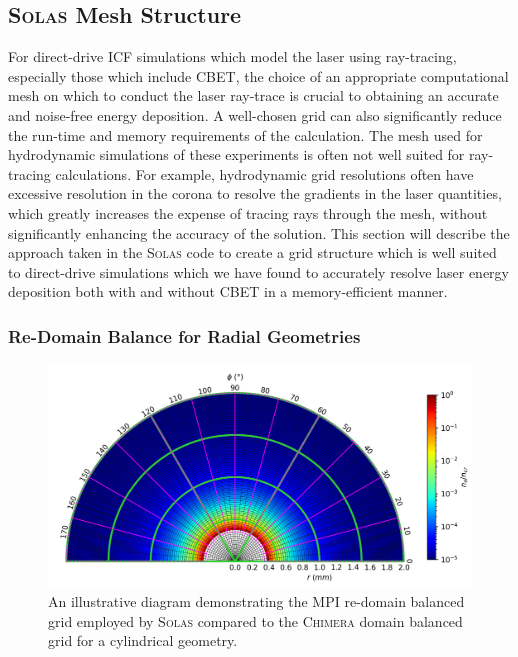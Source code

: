 \subsection{\textsc{Solas} Mesh Structure}
\label{sec:SOLAS_mesh}

For direct-drive \ac{ICF} simulations which model the laser using ray-tracing, especially those which include \ac{CBET}, the choice of an appropriate computational mesh on which to conduct the laser ray-trace is crucial to obtaining an accurate and noise-free energy deposition.
A well-chosen grid can also significantly reduce the run-time and memory requirements of the calculation.
The mesh used for hydrodynamic simulations of these experiments is often not well suited for ray-tracing calculations.
For example, hydrodynamic grid resolutions often have excessive resolution in the corona to resolve the gradients in the laser quantities, which greatly increases the expense of tracing rays through the mesh, without significantly enhancing the accuracy of the solution.
This section will describe the approach taken in the \textsc{Solas} code to create a grid structure which is well suited to direct-drive simulations which we have found to accurately resolve laser energy deposition both with and without \ac{CBET} in a memory-efficient manner.

\subsubsection{Re-Domain Balance for Radial Geometries}

\begin{figure}[t!]
    \includegraphics[width=16cm]{Numerics/Images/SOLAS_CHIMERA_domain.png}
    \centering
    \caption{An illustrative diagram demonstrating the MPI re-domain balanced grid employed by \textsc{Solas} compared to the \textsc{Chimera} domain balanced grid for a cylindrical geometry.}
    \label{fig:SOLAS_CHIMERA_domain}
\end{figure}

